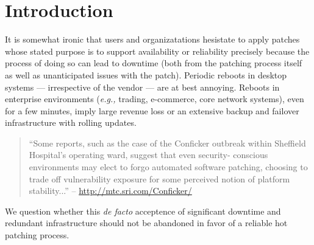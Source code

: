 \section{Introduction}
\label{sec:intro}
It is somewhat ironic that users and organizatations hesistate to
apply patches whose stated purpose is to support availability or
reliability precisely because the process of doing so can lead to
downtime (both from the patching process itself as well as
unanticipated issues with the patch).  Periodic reboots in desktop
systems --- irrespective of the vendor --- are at best annoying.
Reboots in enterprise environments ({\it e.g.,} trading, e-commerce,
core network systems), even for a few minutes, imply large revenue
loss or an extensive backup and failover infrastructure with rolling
updates.  

{\footnotesize
\begin{quote}
``Some reports, such as the case of the Conficker outbreak within 
Sheffield Hospital's operating ward, suggest that even security-
conscious environments may elect to forgo automated software patching, 
choosing to trade off vulnerability exposure for some perceived notion 
of platform stability...'' -- \url{http://mtc.sri.com/Conficker/}
\end{quote}
}

We question whether this {\em de facto} acceptence of
significant downtime and redundant infrastructure should not be
abandoned in favor of a reliable hot patching process.

%
%
%

